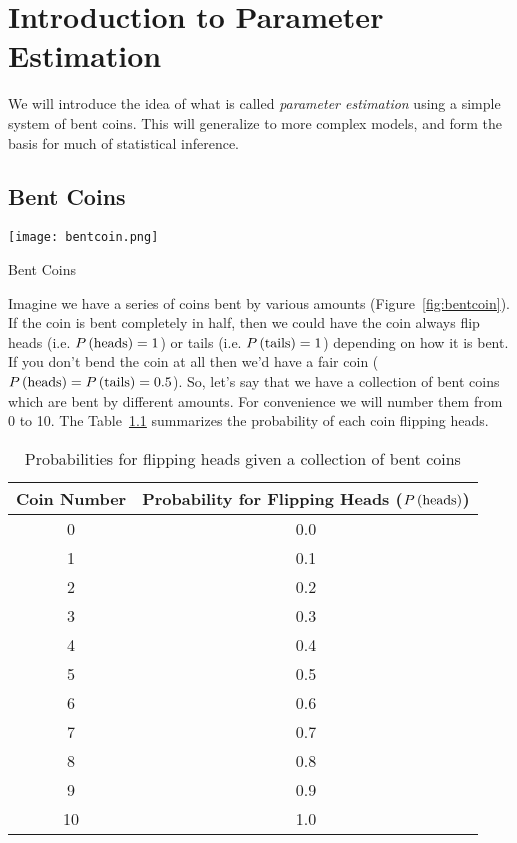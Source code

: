 \chapter{Introduction to Parameter Estimation}\label{ch:parameter1}
We will introduce the idea of what is called {\em parameter estimation} using a simple system of bent coins.  This will generalize to more complex models, and form the basis for much of statistical inference.

\section{Bent Coins}\label{sec:intro_bent_coin}

\begin{marginfigure}
\texttt{[image: bentcoin.png]}
\label{fig:bentcoin}
\caption{Bent Coins}
\end{marginfigure}


Imagine we have a series of coins bent by various amounts (Figure~\ref{fig:bentcoin}).  If the coin is bent completely in half, then we could have the coin always flip heads (i.e. $\P{heads}=1$) or tails (i.e. $\P{tails}=1$) depending on how it is bent.  If you don't bend the coin at all then we'd have a fair coin ($\P{heads}=\P{tails}=0.5$).
  So, let's say that we have a collection of bent coins which are bent by different amounts.  For convenience we will number them from 0 to 10.    The Table~\ref{tbl:bentcoin} summarizes the probability of each coin flipping heads.
\begin{table}
\begin{center}
\begin{tabular}{cc}
Coin Number & Probability for Flipping Heads ($\P{heads}$) \\ \hline\hline
0 & 0.0 \\
1 & 0.1 \\
2 & 0.2 \\
3 & 0.3 \\
4 & 0.4 \\
5 & 0.5 \\
6 & 0.6 \\
7 & 0.7 \\
8 & 0.8 \\
9 & 0.9 \\
10 & 1.0
\end{tabular}
\end{center}
\label{tbl:bentcoin}
\caption{Probabilities for flipping heads given a collection of bent coins}
\end{table}

